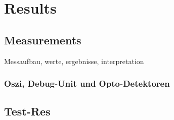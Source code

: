 \documentclass[master,english,smartquotes,apa]{hgbthesis}
\begin{document}
		\section{}
			\subsection{}
			\subsection{}
			\subsection{}
	
	\chapter{Results}
	\label{cha:Results}
	\section{Measurements}
		Messaufbau, werte, ergebnisse, interpretation
		\subsection{Oszi, Debug-Unit und Opto-Detektoren}
		\section{Test-Res}
\end{document}
